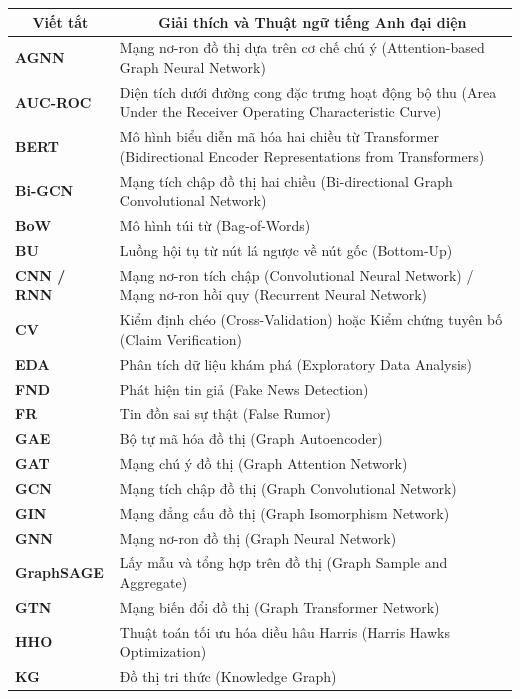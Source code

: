 \documentclass[11pt,a4paper]{extreport}
\begin{document}
\noindent
\begin{tabularx}{\textwidth}{@{}lX@{}}
\toprule
\multicolumn{1}{c}{\textbf{Viết tắt}} & \multicolumn{1}{c}{\textbf{Giải thích và Thuật ngữ tiếng Anh đại diện}} \\
\midrule
\textbf{AGNN} & Mạng nơ-ron đồ thị dựa trên cơ chế chú ý (Attention-based Graph Neural Network) \\
\textbf{AUC-ROC} & Diện tích dưới đường cong đặc trưng hoạt động bộ thu (Area Under the Receiver Operating Characteristic Curve) \\
\textbf{BERT} & Mô hình biểu diễn mã hóa hai chiều từ Transformer (Bidirectional Encoder Representations from Transformers) \\
\textbf{Bi-GCN} & Mạng tích chập đồ thị hai chiều (Bi-directional Graph Convolutional Network) \\
\textbf{BoW} & Mô hình túi từ (Bag-of-Words) \\
\textbf{BU} & Luồng hội tụ từ nút lá ngược về nút gốc (Bottom-Up) \\
\textbf{CNN / RNN} & Mạng nơ-ron tích chập (Convolutional Neural Network) / Mạng nơ-ron hồi quy (Recurrent Neural Network) \\
\textbf{CV} & Kiểm định chéo (Cross-Validation) hoặc Kiểm chứng tuyên bố (Claim Verification) \\
\textbf{EDA} & Phân tích dữ liệu khám phá (Exploratory Data Analysis) \\
\textbf{FND} & Phát hiện tin giả (Fake News Detection) \\
\textbf{FR} & Tin đồn sai sự thật (False Rumor) \\
\textbf{GAE} & Bộ tự mã hóa đồ thị (Graph Autoencoder) \\
\textbf{GAT} & Mạng chú ý đồ thị (Graph Attention Network) \\
\textbf{GCN} & Mạng tích chập đồ thị (Graph Convolutional Network) \\
\textbf{GIN} & Mạng đẳng cấu đồ thị (Graph Isomorphism Network) \\
\textbf{GNN} & Mạng nơ-ron đồ thị (Graph Neural Network) \\
\textbf{GraphSAGE} & Lấy mẫu và tổng hợp trên đồ thị (Graph Sample and Aggregate) \\
\textbf{GTN} & Mạng biến đổi đồ thị (Graph Transformer Network) \\
\textbf{HHO} & Thuật toán tối ưu hóa diều hâu Harris (Harris Hawks Optimization) \\
\textbf{KG} & Đồ thị tri thức (Knowledge Graph) \\

\end{tabularx}
\end{document}
